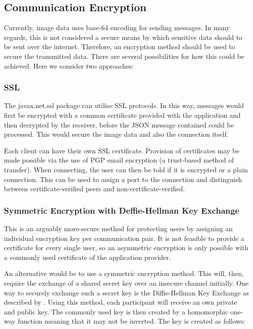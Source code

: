 \documentclass[10pt, a4paper]{article}
\begin{document}
\subsection{Communication Encryption}

Currently, image data uses base-64 encoding for sending messages.
In many regards, this is not considered a secure means by which sensitive data should to be sent over the internet.
Therefore, an encryption method should be used to secure the transmitted data.
There are several possibilities for how this could be achieved.
Here we consider two approaches:

\subsubsection{SSL}

The javax.net.ssl package can utilise SSL protocols.
In this way, messages would first be encrypted with a common certificate provided with the application and then decrypted by the receiver, before the JSON message contained could be processed.
This would secure the image data and also the connection itself.

Each client can have their own SSL certificate.
Provision of certificates may be made possible via the use of PGP email encryption (a trust-based method of transfer).
When connecting, the user can then be told if it is encrypted or a plain connection.
This can be used to assign a port to the connection and distinguish between certificate-verified peers and non-certificate-verified.

\subsubsection{Symmetric Encryption with Deffie-Hellman Key Exchange}

This is an arguably more-secure method for protecting users by assigning an individual encryption key per communication pair.
It is not feasible to provide a certificate for every single user, so an asymmetric encryption is only possible with a commonly used certificate of the application provider.

An alternative would be to use a symmetric encryption method.
This will, then, require the exchange of a shared secret key over an insecure channel initially.
One way to securely exchange such a secret key is the Diffie-Hellman Key Exchange as described by \cite{newdirections}.
Using this method, each participant will receive an own private and public key.
The commonly used key is then created by a homomorphic one-way function meaning that it may not be inverted.
The key is created as follows:
\end{document}
